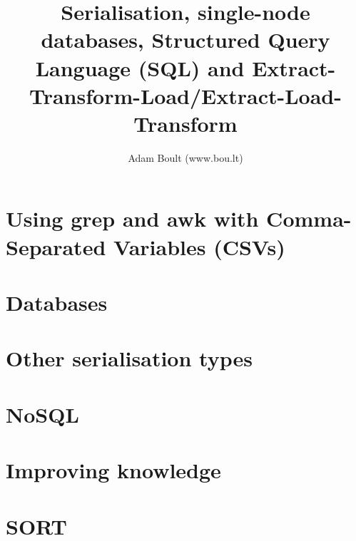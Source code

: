 \documentclass[oneside]{book}
\begin{document}
\author{Adam Boult (www.bou.lt)}
\title{Serialisation, single-node databases, Structured Query Language (SQL) and Extract-Transform-Load/Extract-Load-Transform}
\maketitle

\setcounter{tocdepth}{0}
\tableofcontents



\part{Using grep and awk with Comma-Separated Variables (CSVs)}


\part{Databases}




\part{Other serialisation types}






\part{NoSQL}

\part{Improving knowledge}



\part{SORT}

\end{document}
